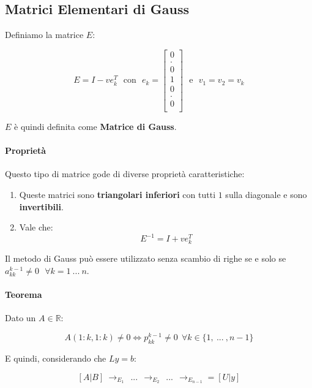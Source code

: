 \documentclass{article}
\begin{document}
\subsection{Matrici Elementari di Gauss}

Definiamo la matrice $E$:

\[ E = I -ve^{T}_{k} \:\:\: \text{con} \:\:\: e_{k} = \begin{bmatrix}
    0 \\
    . \\
    0 \\
    1 \\
    0 \\
    . \\
    0 \\
    
\end{bmatrix}
\:\:\: \text{e} \:\:\: 
v_{1} = v_{2} = v_{k}
\]

$E$ è quindi definita come \textbf{Matrice di Gauss}.

\paragraph{Proprietà} Questo tipo di matrice gode di diverse proprietà caratteristiche:

\begin{enumerate}
    \item Queste matrici sono \textbf{triangolari inferiori} con tutti $1$ sulla diagonale e sono \textbf{invertibili}.
    \item Vale che:
    \vspace*{5px}
    \[ E^{-1} = I + ve^T_k \]
\end{enumerate}

Il metodo di Gauss può essere utilizzato senza scambio di \newline righe se e solo se
$a^{k-1}_{kk} \neq 0 \:\:\: \forall k = 1 \: ... \: n$.

\newpage

\paragraph{Teorema} Dato un $A \in \mathbb{R}$: 

\[ A(1:k,1:k) \neq 0  \Leftrightarrow p^{k-1}_{kk} \neq 0 \:\: \forall k \in \{ 1, \: ... \:, n-1 \} \]

E quindi, considerando che $Ly = b$:

\[ [A|B] \: \rightarrow_{E_{1}} \:\: ... \:\: \rightarrow_{E_{2}} \:\: ... \:\: \rightarrow_{E_{n-1}} = [U|y] \] 
\end{document}
